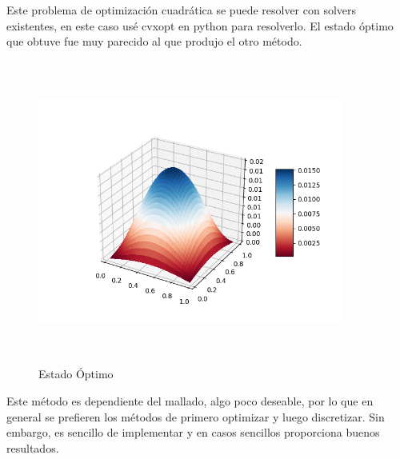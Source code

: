 \documentclass{article}
\begin{document}
Este problema de optimización cuadrática se puede resolver con solvers existentes, en este caso usé cvxopt en python para resolverlo. El estado óptimo que obtuve fue muy parecido al que produjo el otro método.
\begin{figure}[H]
    \centering
    \includegraphics[width=10cm, height=10cm]{cuadratica.png}
    \caption{Estado Óptimo}
    \label{fig:my_label}
\end{figure}
Este método es dependiente del mallado, algo poco deseable, por lo que en general se prefieren los métodos de primero optimizar y luego discretizar. Sin embargo, es sencillo de implementar y en casos sencillos proporciona buenos resultados.








\nocite{*}


\end{document}

